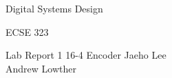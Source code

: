 \documentclass[12pt,letterpaper,titlepage]{article}
\begin{document}
\begin{titlepage}
	\centering
	{\LARGE Digital Systems Design \par}
	{\LARGE ECSE 323 \par}
	\vspace{.5cm}
	{\LARGE Lab Report 1}
	{\LARGE 16-4 Encoder}
	\vfill
	Jaeho Lee \\
	Andrew Lowther \\
\end{titlepage}



\end{document}

